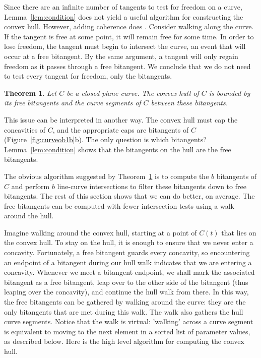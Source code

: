 \documentclass{sig-alternate}
\newtheorem{theorem}{Theorem}
\begin{document}
Since there are an infinite number of tangents to test for freedom on a curve,
Lemma~\ref{lem:condition} does not yield a useful algorithm for constructing the convex hull.
However, adding coherence does \cite{foleyvandam}.
Consider walking along the curve.
If the tangent is free at some point, it will remain free for some time.
In order to lose freedom, the tangent must begin to intersect the curve,
an event that will occur at a free bitangent. %
By the same argument, a tangent will only regain freedom as it passes through a free bitangent.
We conclude that we do not need to test every tangent for freedom, only the bitangents.

\begin{theorem}
\label{thm:chull}
Let $C$ be a closed plane curve.
The convex hull of $C$ is bounded by its free bitangents
and the curve segments of $C$ between these bitangents.
\end{theorem}

This issue can be interpreted in another way.
The convex hull must cap the concavities of $C$,
and the appropriate caps are bitangents of $C$ (Figure~\ref{fig:curveob1b}b).
The only question is which bitangents?
Lemma~\ref{lem:condition} shows that the bitangents on the hull are the free bitangents.


The obvious algorithm suggested by Theorem~\ref{thm:chull} is to compute
the $b$ bitangents of $C$ \cite{jj01} and perform $b$ line-curve intersections 
to filter these bitangents down to free bitangents. 
The rest of this section shows that we can do better, on average.
The free bitangents can be computed with fewer intersection tests using a walk around the hull.

Imagine walking around the convex hull, starting at a point of $C(t)$
that lies on the convex hull.
To stay on the hull, it is enough to ensure that we never enter a concavity.
Fortunately, a free bitangent guards every concavity,
so encountering an endpoint of a bitangent during our hull walk
indicates that we are entering a concavity.
Whenever we meet a bitangent endpoint, we shall mark the associated bitangent
as a free bitangent, leap over to the other side of the bitangent
(thus leaping over the concavity), and continue the hull walk from there.
In this way, the free bitangents can be gathered by walking around the curve:
they are the only bitangents that are met during this walk.
The walk also gathers the hull curve segments.
Notice that the walk is virtual:
'walking' across a curve segment is equivalent to moving to the next
element in a sorted list of parameter values, as described below.
Here is the high level algorithm for computing the convex hull.
\end{document}
